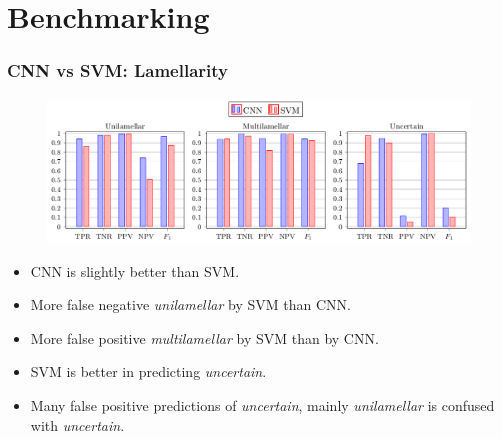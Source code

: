 \documentclass{beamer}
\begin{document}
%
%

\section{Benchmarking}

\begin{frame}
\frametitle{CNN vs SVM: Lamellarity}

\begin{figure}
\centering
\includegraphics[width=\linewidth,height=0.8\textheight,keepaspectratio]{cnn_vs_svm_lamellarity.png} 
\end{figure}

\begin{itemize}
\item CNN is slightly better than SVM.
\item More false negative \textit{unilamellar} by SVM than CNN.
\item More false positive \textit{multilamellar} by SVM than by CNN.
\item SVM is better in predicting \textit{uncertain}.
\item Many false positive predictions of \textit{uncertain}, mainly \textit{unilamellar} is confused with \textit{uncertain}.
\end{itemize}

\end{frame}
\end{document}

